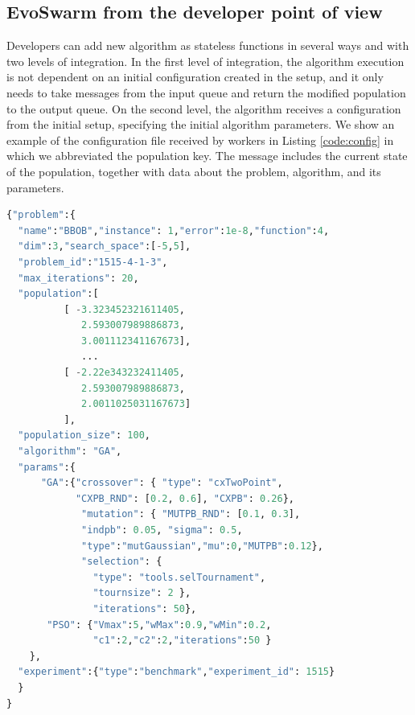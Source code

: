 \documentclass[review]{elsarticle}
\begin{document}
\subsection{EvoSwarm from the developer point of view} 

Developers can add new algorithm as stateless functions in
several ways and with two levels of integration. In the first level of
integration, the algorithm execution is not dependent on an initial
configuration created in the setup, and it only needs to take messages from the
input queue and return the modified population to the output queue. On the
second level, the algorithm receives a configuration from the initial setup,
specifying the initial algorithm parameters. We show an example of the configuration
file received by workers in Listing \ref{code:config}  in which we abbreviated
the population key. The message includes the current state
of the population, together with data about the problem, algorithm,
and its parameters. 

\begin{lstlisting}[language=Python, caption = Configuration message example, label=code:config]
{"problem":{
  "name":"BBOB","instance": 1,"error":1e-8,"function":4,
  "dim":3,"search_space":[-5,5],
  "problem_id":"1515-4-1-3",
  "max_iterations": 20,
  "population":[
          [ -3.323452321611405, 
             2.593007989886873, 
             3.001112341167673],
             ...
          [ -2.22e343232411405, 
             2.593007989886873, 
             2.0011025031167673] 
          ],
  "population_size": 100,
  "algorithm": "GA",  
  "params":{
      "GA":{"crossover": { "type": "cxTwoPoint", 
            "CXPB_RND": [0.2, 0.6], "CXPB": 0.26},
             "mutation": { "MUTPB_RND": [0.1, 0.3], 
             "indpb": 0.05, "sigma": 0.5, 
             "type":"mutGaussian","mu":0,"MUTPB":0.12},
             "selection": { 
               "type": "tools.selTournament", 
               "tournsize": 2 },
               "iterations": 50},
       "PSO": {"Vmax":5,"wMax":0.9,"wMin":0.2,
               "c1":2,"c2":2,"iterations":50 } 
    },
  "experiment":{"type":"benchmark","experiment_id": 1515}
  }
}
\end{lstlisting}
\end{document}

